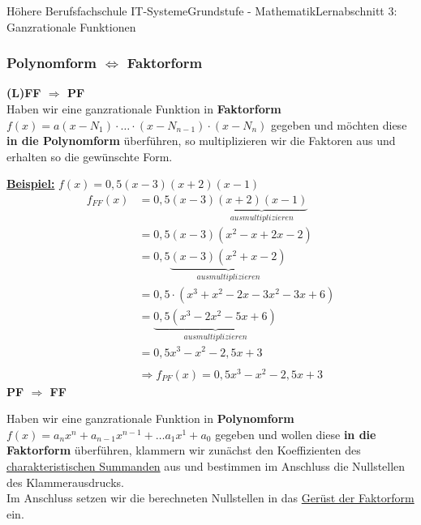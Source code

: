 \documentclass[11pt,twocolumn,oneside,openany,headings=optiontotoc,11pt,numbers=noenddot]{article}
\begin{document}
\begin{worksheet}{Höhere Berufsfachschule IT-Systeme}{Grundstufe - Mathematik}{Lernabschnitt 3: Ganzrationale Funktionen}
		\subsubsection*{Polynomform \(\Leftrightarrow\) Faktorform}
		\textbf{(L)FF \(\Rightarrow\) PF}\\
		Haben wir eine ganzrationale Funktion in \textbf{Faktorform} \(f(x) = a(x-N_1)\cdot\ldots\cdot(x-N_{n-1})\cdot(x-N_{n})\) gegeben und möchten diese \textbf{in die Polynomform} überführen, so multiplizieren wir die Faktoren aus und erhalten so die gewünschte Form.\\
		\par\noindent
		\underline{\textbf{Beispiel:}} \(f(x) = 0,5(x-3)(x+2)(x-1)\)
		\begin{align*}
			f_{FF}(x) & = 0,5(x-3)\underbrace{(x+2)(x-1)}_{ausmultiplizieren}\\
			& = 0,5(x-3)(x^2 - x +2x -2)\\
			& = 0,5\underbrace{(x-3)(x^2 + x -2)}_{ausmultiplizieren}\\
			& = 0,5\cdot(x^3 +x^2 -2x -3x^2 -3x +6)\\
			& = \underbrace{0,5(x^3 -2x^2 -5x +6)}_{ausmultiplizieren}\\
			& = 0,5x^3 - x^2 -2,5x +3\\
			\\
			& \Rightarrow f_{PF}(x) = 0,5x^3 -x^2 -2,5x + 3
		\end{align*}
		\textbf{PF \(\Rightarrow\) FF}\\
		\par\noindent
		Haben wir eine ganzrationale Funktion in \textbf{Polynomform} \(f(x) = a_nx^n + a_{n-1}x^{n-1} + \ldots a_1x^1 + a_0\) gegeben und wollen diese \textbf{in die Faktorform} überführen, klammern wir zunächst den Koeffizienten des \underline{charakteristischen Summanden} aus und bestimmen im Anschluss die Nullstellen des Klammerausdrucks.\\
		Im Anschluss setzen wir die berechneten Nullstellen in das \underline{Gerüst der Faktorform} ein.\\
		\par\noindent
	\end{worksheet}
\end{document}
